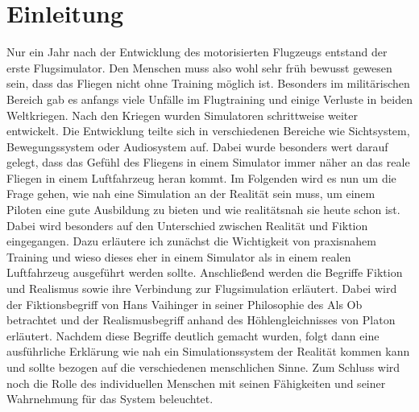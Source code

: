 \documentclass[12pt]{article}
\begin{document}
\section{Einleitung}
Nur ein Jahr nach der Entwicklung des motorisierten Flugzeugs entstand der erste Flugsimulator. Den Menschen muss also wohl sehr früh bewusst gewesen sein, dass das Fliegen nicht ohne Training möglich ist. Besonders im militärischen Bereich gab es anfangs viele Unfälle im Flugtraining und einige Verluste in beiden Weltkriegen. Nach den Kriegen wurden Simulatoren schrittweise weiter entwickelt. Die Entwicklung teilte sich in verschiedenen Bereiche wie Sichtsystem, Bewegungssystem oder Audiosystem auf. Dabei wurde besonders wert darauf gelegt, dass das Gefühl des Fliegens in einem Simulator immer näher an das reale Fliegen in einem Luftfahrzeug heran kommt.\newline
Im Folgenden wird es nun um die Frage gehen, wie nah eine Simulation an der Realität sein muss, um einem Piloten eine gute Ausbildung zu bieten und wie realitätsnah sie heute schon ist. Dabei wird besonders auf den Unterschied zwischen Realität und Fiktion eingegangen.\newline
Dazu erläutere ich zunächst die Wichtigkeit von praxisnahem Training und wieso dieses eher in einem Simulator als in einem realen Luftfahrzeug ausgeführt werden sollte.\newline
Anschließend werden die Begriffe Fiktion und Realismus sowie ihre Verbindung zur Flugsimulation erläutert. Dabei wird der Fiktionsbegriff von Hans Vaihinger in seiner \glqq Philosophie des Als Ob\grqq{} betrachtet und der Realismusbegriff anhand des Höhlengleichnisses von Platon erläutert.\newline
Nachdem diese Begriffe deutlich gemacht wurden, folgt dann eine ausführliche Erklärung wie nah ein Simulationssystem der Realität kommen kann und sollte bezogen auf die verschiedenen menschlichen Sinne. Zum Schluss wird noch die Rolle des individuellen Menschen mit seinen Fähigkeiten und seiner Wahrnehmung für das System beleuchtet.\newline

%
%
\end{document}
